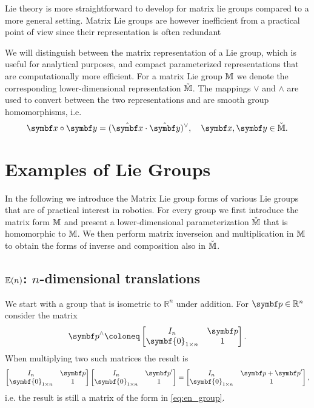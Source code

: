 Lie theory is more straightforward to develop for matrix lie groups compared to a more general setting. Matrix Lie groups are however inefficient from a practical point of view since their representation is often redundant

We will distinguish between the matrix representation of a Lie group, which is useful for analytical purposes, and compact parameterized representations that are computationally more efficient. For a matrix Lie group $\mathbb{M}$ we denote the corresponding lower-dimensional representation $\check{\mathbb{M}}$. The mappings $\vee$ and $\wedge$ are used to convert between the two representations and are smooth group homomorphisms, i.e.
\begin{equation}
  \x \circ \y = (\hat \x \cdot \hat \y)^{\vee}, \quad \x, \y \in \cM.
\end{equation}


\section{Examples of Lie Groups}

In the following we introduce the Matrix Lie group forms of various  Lie groups that are of practical interest in robotics. For every group we first introduce the matrix form $\mathbb{M}$ and present a lower-dimensional parameterization $\check{\mathbb{M}}$ that is homomorphic to $\mathbb{M}$. We then perform matrix inverseion and multiplication in $\mathbb{M}$ to obtain the forms of inverse and composition also in $\check{\mathbb{M}}$.

\subsection{\texorpdfstring{${\mathbb{E}(n)}$}{E(n)}: \texorpdfstring{$n$}{n}-dimensional translations}
We start with a group that is isometric to $\mathbb{R}^n$ under addition. For $\bp \in \mathbb{R}^n$ consider the matrix
\begin{equation}
  \label{eq:en_group}
  \bp^{\wedge} \coloneq \begin{bmatrix}
    I_n & \bp \\ \symbf{0}_{1 \times n} & 1
  \end{bmatrix}.
\end{equation}
When multiplying two such matrices the result is
\begin{equation}
  \begin{bmatrix}
    I_n & \bp \\ \symbf{0}_{1 \times n} & 1
  \end{bmatrix} \begin{bmatrix}
    I_n & \bp' \\ \symbf{0}_{1 \times n} & 1
  \end{bmatrix} = \begin{bmatrix}
    I_n & \bp + \bp' \\ \symbf{0}_{1 \times n} & 1
  \end{bmatrix},
\end{equation}
i.e. the result is still a matrix of the form in \eqref{eq:en_group}.

